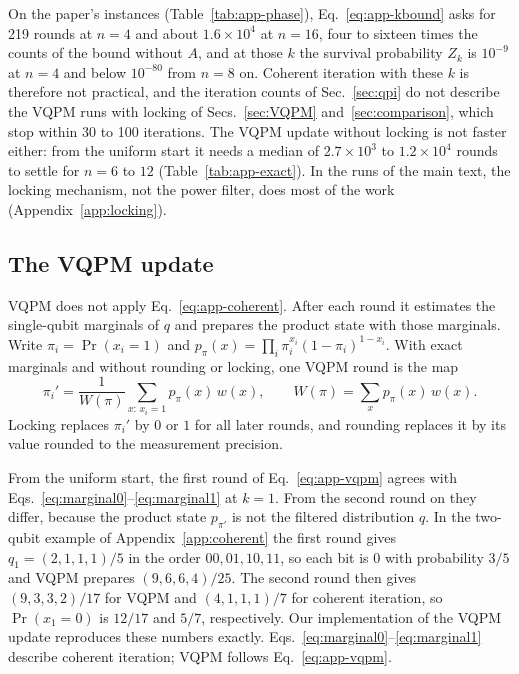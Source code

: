 On the paper's instances (Table~\ref{tab:app-phase}), Eq.~\eqref{eq:app-kbound} asks for 219 rounds at $n=4$ and about $1.6\times10^4$ at $n=16$, four to sixteen times the counts of the bound without $A$, and at those $k$ the survival probability $Z_k$ is $10^{-9}$ at $n=4$ and below $10^{-80}$ from $n=8$ on. Coherent iteration with these $k$ is therefore not practical, and the iteration counts of Sec.~\ref{sec:qpi} do not describe the VQPM runs with locking of Secs.~\ref{sec:VQPM} and~\ref{sec:comparison}, which stop within 30 to 100 iterations. The VQPM update without locking is not faster either: from the uniform start it needs a median of $2.7\times10^3$ to $1.2\times10^4$ rounds to settle for $n=6$ to $12$ (Table~\ref{tab:app-exact}). In the runs of the main text, the locking mechanism, not the power filter, does most of the work (Appendix~\ref{app:locking}).

\subsection{The VQPM update}
\label{app:vqpm-map}
VQPM does not apply Eq.~\eqref{eq:app-coherent}. After each round it estimates the single-qubit marginals of $q$ and prepares the product state with those marginals. Write $\pi_i=\Pr(x_i=1)$ and $p_\pi(x)=\prod_i\pi_i^{x_i}(1-\pi_i)^{1-x_i}$. With exact marginals and without rounding or locking, one VQPM round is the map
\begin{equation}
\pi_i'=\frac{1}{W(\pi)}\sum_{x:\,x_i=1}p_\pi(x)\,w(x),\qquad W(\pi)=\sum_xp_\pi(x)\,w(x).
\label{eq:app-vqpm}
\end{equation}
Locking replaces $\pi_i'$ by $0$ or $1$ for all later rounds, and rounding replaces it by its value rounded to the measurement precision.

From the uniform start, the first round of Eq.~\eqref{eq:app-vqpm} agrees with Eqs.~\eqref{eq:marginal0}--\eqref{eq:marginal1} at $k=1$. From the second round on they differ, because the product state $p_{\pi'}$ is not the filtered distribution $q$. In the two-qubit example of Appendix~\ref{app:coherent} the first round gives $q_1=(2,1,1,1)/5$ in the order $00,01,10,11$, so each bit is $0$ with probability $3/5$ and VQPM prepares $(9,6,6,4)/25$. The second round then gives $(9,3,3,2)/17$ for VQPM and $(4,1,1,1)/7$ for coherent iteration, so $\Pr(x_1=0)$ is $12/17$ and $5/7$, respectively. Our implementation of the VQPM update reproduces these numbers exactly. Eqs.~\eqref{eq:marginal0}--\eqref{eq:marginal1} describe coherent iteration; VQPM follows Eq.~\eqref{eq:app-vqpm}.

